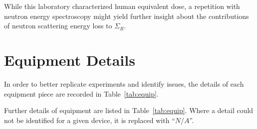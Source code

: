 \documentclass[12pt]{article}
\newcommand{\XSr}{\Sigma_R}
\begin{document}
While this laboratory characterized human equivalent dose, a repetition with neutron energy spectroscopy might yield further insight about the contributions of neutron scattering energy loss to $\XSr$.

% 
\pagebreak\printbibliography

\appendix
\pagebreak
\FloatBarrier\section{Equipment Details}\label{app:equip}
In order to better replicate experiments and identify issues, the details of each equipment piece are recorded in Table~\ref{tab:equip}.

\newcommand{\na}{$N/A$}
\newcommand{\sref}[1]{$^{\ref{#1}}$}
\FloatBarrier
Further details of equipment are listed in Table~\ref{tab:equip}.
Where a detail could not be identified for a given device, it is replaced with ``\na''.
\end{document}
